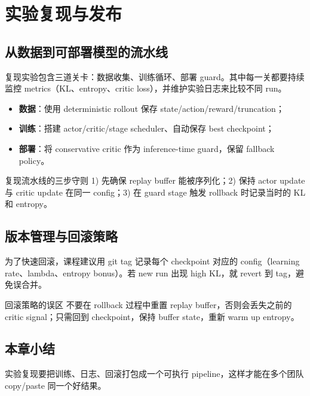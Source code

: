 \section{实验复现与发布}

\subsection{从数据到可部署模型的流水线}

复现实验包含三道关卡：数据收集、训练循环、部署 guard。其中每一关都要持续监控 metrics（KL、entropy、critic loss），并维护实验日志来比较不同 run。

\begin{itemize}
    \item \textbf{数据}：使用 deterministic rollout 保存 state/action/reward/truncation；
    \item \textbf{训练}：搭建 actor/critic/stage scheduler、自动保存 best checkpoint；
    \item \textbf{部署}：将 conservative critic 作为 inference-time guard，保留 fallback policy。
\end{itemize}

\begin{importantbox}{复现流水线的三步守则}
1) 先确保 replay buffer 能被序列化；2) 保持 actor update 与 critic update 在同一 config；3) 在 guard stage 触发 rollback 时记录当时的 KL 和 entropy。
\end{importantbox}

\subsection{版本管理与回滚策略}

为了快速回滚，课程建议用 git tag 记录每个 checkpoint 对应的 config（learning rate、lambda、entropy bonus）。若 new run 出现 high KL，就 revert 到 tag，避免误合并。

\begin{warningbox}{回滚策略的误区}
不要在 rollback 过程中重置 replay buffer，否则会丢失之前的 critic signal；只需回到 checkpoint，保持 buffer state，重新 warm up entropy。
\end{warningbox}

\subsection{本章小结}

实验复现要把训练、日志、回滚打包成一个可执行 pipeline，这样才能在多个团队 copy/paste 同一个好结果。

